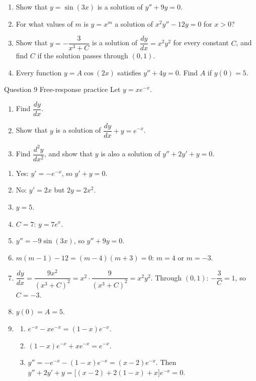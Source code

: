 \documentclass[11pt]{article}
\begin{document}
\begin{enumerate}[leftmargin=*,itemsep=2pt,start=5]
  \item Show that $y=\sin(3x)$ is a solution of $y''+9y=0$.\work{2.8cm}
  \item For what values of $m$ is $y=x^m$ a solution of $x^2y''-12y=0$ for $x>0$?\work{2.8cm}
  \item Show that $y=-\dfrac{3}{x^3+C}$ is a solution of $\dfrac{dy}{dx}=x^2y^2$ for every constant $C$, and find $C$ if the solution passes through $(0,1)$.\work{2.8cm}
  \item Every function $y=A\cos(2x)$ satisfies $y''+4y=0$. Find $A$ if $y(0)=5$.\work{2.8cm}
\end{enumerate}

\begin{frbox}{Question 9 \textperiodcentered{} Free-response practice}
Let $y=xe^{-x}$.
\begin{enumerate}[label=(\alph*),leftmargin=*,itemsep=2pt]
  \item Find $\dfrac{dy}{dx}$.\work{2.6cm}
  \item Show that $y$ is a solution of $\dfrac{dy}{dx}+y=e^{-x}$.\work{2.6cm}
  \item Find $\dfrac{d^2y}{dx^2}$, and show that $y$ is also a solution of $y''+2y'+y=0$.\work{2.6cm}
\end{enumerate}
\end{frbox}

\newpage
\begin{solbox}
\begin{enumerate}[leftmargin=*,itemsep=4pt]
  \item Yes: $y'=-e^{-x}$, so $y'+y=0$.
  \item No: $y'=2x$ but $2y=2x^2$.
  \item $y=5$.
  \item $C=7$: $y=7e^{x}$.
  \item $y''=-9\sin(3x)$, so $y''+9y=0$.
  \item $m(m-1)-12=(m-4)(m+3)=0$: $m=4$ or $m=-3$.
  \item $\dfrac{dy}{dx}=\dfrac{9x^2}{(x^3+C)^2}=x^2\cdot\dfrac{9}{(x^3+C)^2}=x^2y^2$. Through $(0,1)$: $-\dfrac3C=1$, so $C=-3$.
  \item $y(0)=A=5$.
  \item \begin{enumerate}[label=(\alph*),leftmargin=*,itemsep=3pt]
    \item $e^{-x}-xe^{-x}=(1-x)e^{-x}$.
    \item $(1-x)e^{-x}+xe^{-x}=e^{-x}$.
    \item $y''=-e^{-x}-(1-x)e^{-x}=(x-2)e^{-x}$. Then $y''+2y'+y=\big[(x-2)+2(1-x)+x\big]e^{-x}=0$.
  \end{enumerate}
\end{enumerate}
\end{solbox}
\end{document}
